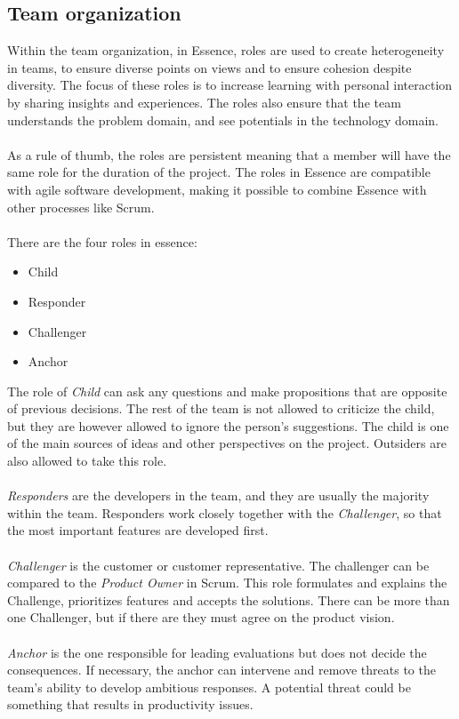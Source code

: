 \subsection{Team organization}
Within the team organization, in Essence, roles are used to create heterogeneity in teams, to ensure diverse points on views and to ensure cohesion despite diversity.
The focus of these roles is to increase learning with personal interaction by sharing insights and experiences.
The roles also ensure that the team understands the problem domain, and see potentials in the technology domain.
\\\\
As a rule of thumb, the roles are persistent meaning that a member will have the same role for the duration of the project.
The roles in Essence are compatible with agile software development, making it possible to combine Essence with other processes like Scrum.
\\\\
There are the four roles in essence:
\begin{itemize}
    \item Child
    \item Responder
    \item Challenger
    \item Anchor
\end{itemize}
The role of \textit{Child} can ask any questions and make propositions that are opposite of previous decisions.
The rest of the team is not allowed to criticize the child, but they are however allowed to ignore the person's suggestions.
The child is one of the main sources of ideas and other perspectives on the project.
Outsiders are also allowed to take this role.
\\\\
\textit{Responders} are the developers in the team, and they are usually the majority within the team.
Responders work closely together with the \textit{Challenger}, so that the most important features are developed first.
\\\\
\textit{Challenger} is the customer or customer representative. 
The challenger can be compared to the \textit{Product Owner} in Scrum.
This role formulates and explains the Challenge, prioritizes features and accepts the solutions.
There can be more than one Challenger, but if there are they must agree on the product vision.
\\\\
\textit{Anchor} is the one responsible for leading evaluations but does not decide the consequences.
If necessary, the anchor can intervene and remove threats to the team's ability to develop ambitious responses. 
A potential threat could be something that results in productivity issues.

